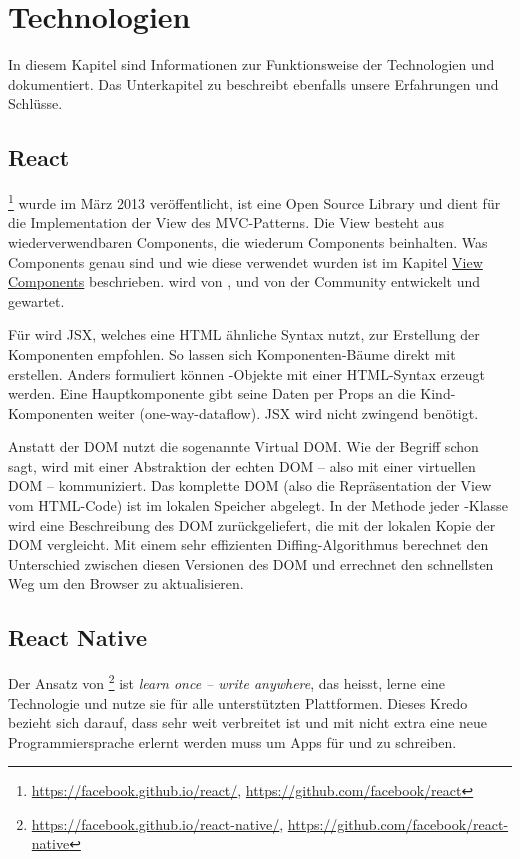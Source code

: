\chapter{Technologien}
\label{pd-technologien}
In diesem Kapitel sind Informationen zur Funktionsweise der Technologien  und  dokumentiert. 
Das Unterkapitel zu  beschreibt ebenfalls unsere Erfahrungen und Schlüsse.


\section{React} 
\footnote{\url{https://facebook.github.io/react/}, \url{https://github.com/facebook/react}} wurde im März 2013 veröffentlicht\cite{react-release}, ist eine Open Source  \gls{Library} und dient für die Implementation der View des \gls{MVC}-Patterns. 
Die View besteht aus wiederverwendbaren Components, die wiederum Components beinhalten. 
Was Components genau sind und wie diese verwendet wurden ist im Kapitel \hyperref[pd-implementation-components]{View Components} beschrieben. 
 wird von ,  und von der Community entwickelt und gewartet.\cite{react}

Für  wird \gls{JSX}, welches eine HTML ähnliche Syntax nutzt, zur Erstellung der Komponenten empfohlen. 
So lassen sich Komponenten-Bäume direkt mit  erstellen. 
Anders formuliert können -Objekte mit einer HTML-Syntax erzeugt werden. 
Eine Hauptkomponente gibt seine Daten per Props an die Kind-Komponenten weiter (one-way-dataflow).\cite{react-data-flow}
JSX wird nicht zwingend benötigt.\cite{jsx-syntax}

Anstatt der \gls{DOM} nutzt  die sogenannte \gls{Virtual DOM}.
Wie der Begriff schon sagt, wird mit einer Abstraktion der echten DOM -- also mit einer virtuellen DOM -- kommuniziert.
Das komplette DOM (also die Repräsentation der View vom HTML-Code) ist im lokalen Speicher abgelegt.\cite{virtual-dom}
In der  Methode jeder -Klasse wird eine Beschreibung des DOM zurückgeliefert, die  mit der lokalen Kopie der DOM vergleicht.
Mit einem sehr effizienten Diffing-Algorithmus berechnet  den Unterschied zwischen diesen  Versionen des DOM und errechnet den schnellsten Weg um den Browser zu aktualisieren.\cite{react-virtual-dom}


\section{React Native}
Der Ansatz von \footnote{\url{https://facebook.github.io/react-native/}, \url{https://github.com/facebook/react-native}} ist \textit{learn once -- write anywhere}, das heisst, lerne eine Technologie und nutze sie für alle unterstützten Plattformen.\cite{react-native}
Dieses Kredo bezieht sich darauf, dass  sehr weit verbreitet ist und mit  nicht extra eine neue Programmiersprache erlernt werden muss um Apps für  und  zu schreiben.

